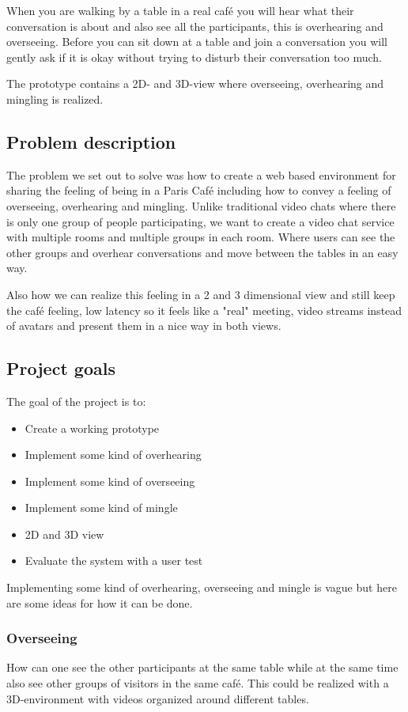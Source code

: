 \documentclass[12pt, titlepage]{article}
\begin{document}
When you are walking by a table in a real café you will hear what their conversation is about and also see all the participants, this is overhearing and overseeing. Before you can sit down at a table and join a conversation you will gently ask if it is okay without trying to disturb their conversation too much.

The prototype contains a 2D- and 3D-view where overseeing, overhearing and mingling is realized.

\subsection{Problem description}
The problem we set out to solve was how to create a web based environment for sharing the feeling of being in a Paris Café including how to convey a feeling of overseeing, overhearing and mingling. Unlike traditional video chats where there is only one group of people participating, we want to create a video chat service with multiple rooms and multiple groups in each room. Where users can see the other groups and overhear conversations and move between the tables in an easy way.

Also how we can realize this feeling in a 2 and 3 dimensional view and still keep the café feeling, low latency so it feels like a "real" meeting, video streams instead of avatars and present them in a nice way in both views.
\subsection{Project goals}
The goal of the project is to:
\begin{itemize}
  \item Create a working prototype
  \item Implement some kind of overhearing
  \item Implement some kind of overseeing
  \item Implement some kind of mingle
  \item 2D and 3D view
  \item Evaluate the system with a user test
\end{itemize}
Implementing some kind of overhearing, overseeing and mingle is vague but here are some ideas for how it can be done.
\subsubsection{Overseeing}
How can one see the other participants at the same table while at the same time also see other groups of visitors in the same café. This could be realized with a 3D-environment with videos organized around different tables.
\end{document}
